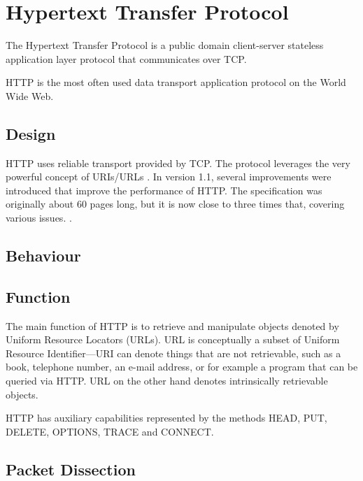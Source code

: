 \documentclass[10pt]{report}
\begin{document}
\chapter{Hypertext Transfer Protocol}
\thispagestyle{fancy}

The Hypertext Transfer Protocol is a public domain client-server
stateless application layer protocol that communicates over TCP.
\cite{rfc1945} \cite{rfc2616}
\cite[pp122--124]{kurose}

HTTP is the most often used data transport application protocol on the
World Wide Web.

\section{Design}

HTTP uses reliable transport provided by TCP.  The protocol leverages
the very powerful concept of URIs/URLs \cite{rfc1738}.  In version 1.1,
several improvements were introduced that improve the performance of
HTTP.  The specification was originally about 60 pages long, but it is
now close to three times that, covering various issues. \cite{rfc2616}.

\section{Behaviour}


\section{Function}

The main function of HTTP is to retrieve and manipulate objects denoted
by Uniform Resource Locators (URLs).  URL is conceptually a subset of
Uniform Resource Identifier---URI can denote things that are not
retrievable, such as a book, telephone number, an e-mail address, or for
example a program that can be queried via HTTP.  URL on the other hand
denotes intrinsically retrievable objects. \cite{rfc1738}

HTTP has auxiliary capabilities represented by the methods HEAD, PUT,
DELETE, OPTIONS, TRACE and CONNECT.

\section{Packet Dissection}
\end{document}
